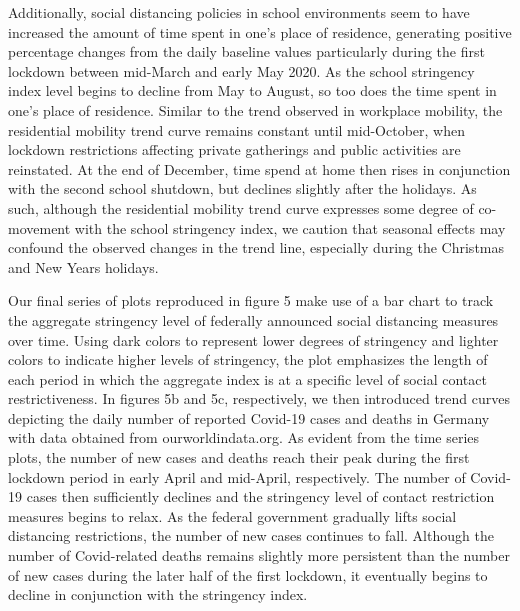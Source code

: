 Additionally, social distancing policies in school environments seem to have increased the amount of time spent in one’s place of residence, generating positive percentage changes from the daily baseline values particularly during the first lockdown between mid-March and early May 2020. As the school stringency index level begins to decline from May to August, so too does the time spent in one’s place of residence. Similar to the trend observed in workplace mobility, the residential mobility trend curve remains constant until mid-October, when lockdown restrictions affecting private gatherings and public activities are reinstated. At the end of December, time spend at home then rises in conjunction with the second school shutdown, but declines slightly after the holidays. As such, although the residential mobility trend curve expresses some degree of co-movement with the school stringency index, we caution that seasonal effects may confound the observed changes in the trend line, especially during the Christmas and New Years holidays. 

Our final series of plots reproduced in figure 5 make use of a bar chart to track the aggregate stringency level of federally announced social distancing measures over time. Using dark colors to represent lower degrees of stringency and lighter colors to indicate higher levels of stringency, the plot emphasizes the length of each period in which the aggregate index is at a specific level of social contact restrictiveness. In figures 5b and 5c, respectively, we then introduced trend curves depicting the daily number of reported Covid-19 cases and deaths in Germany with data obtained from ourworldindata.org. As evident from the time series plots, the number of new cases and deaths reach their peak during the first lockdown period in early April and mid-April, respectively. The number of Covid-19 cases then sufficiently declines and the stringency level of contact restriction measures begins to relax. As the federal government gradually lifts social distancing restrictions, the number of new cases continues to fall. Although the number of Covid-related deaths remains slightly more persistent than the number of new cases during the later half of the first lockdown, it eventually begins to decline in conjunction with the stringency index. 

